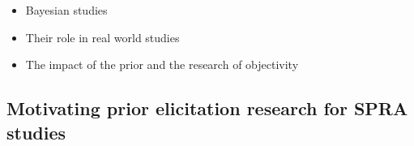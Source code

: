 



\begin{itemize}
    \item Bayesian studies
    \item Their role in real world studies
    \item The impact of the prior and the research of objectivity
\end{itemize}

\subsection{Motivating prior elicitation research for SPRA studies}





